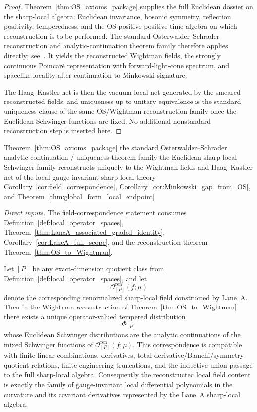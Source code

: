 \begin{proof}
Theorem~\ref{thm:OS_axioms_package} supplies the full Euclidean dossier on the sharp-local algebra: Euclidean invariance, bosonic symmetry, reflection positivity, temperedness, and the OS-positive positive-time algebra on which reconstruction is to be performed. The standard Osterwalder--Schrader reconstruction and analytic-continuation theorem family therefore applies directly; see~\cite{OS1,OS2}. It yields the reconstructed Wightman fields, the strongly continuous Poincar\'e representation with forward-light-cone spectrum, and spacelike locality after continuation to Minkowski signature.

The Haag--Kastler net is then the vacuum local net generated by the smeared reconstructed fields, and uniqueness up to unitary equivalence is the standard uniqueness clause of the same OS/Wightman reconstruction family once the Euclidean Schwinger functions are fixed. No additional nonstandard reconstruction step is inserted here.
\end{proof}

\dependencyledger
  {Theorem~\ref{thm:OS_axioms_package}}
  {the standard Osterwalder--Schrader analytic-continuation / uniqueness theorem family}
  {the Euclidean sharp-local Schwinger family reconstructs uniquely to the Wightman fields and Haag--Kastler net of the local gauge-invariant sharp-local theory}
  {Corollary~\ref{cor:field_correspondence}, Corollary~\ref{cor:Minkowski_gap_from_OS}, and Theorem~\ref{thm:global_form_local_endpoint}}

\noindent\emph{Direct inputs.} The field-correspondence statement consumes Definition~\ref{def:local_operator_spaces}, Theorem~\ref{thm:LaneA_associated_graded_identity}, Corollary~\ref{cor:LaneA_full_scope}, and the reconstruction theorem Theorem~\ref{thm:OS_to_Wightman}.\par

\begin{corollary}\label{cor:field_correspondence}
Let $[P]$ be any exact-dimension quotient class from Definition~\ref{def:local_operator_spaces}, and let
\[
\mathcal O^{\mathrm{ren}}_{[P]}(f;\mu)
\]
denote the corresponding renormalized sharp-local field constructed by Lane~A.
Then in the Wightman reconstruction of Theorem~\ref{thm:OS_to_Wightman} there exists a unique operator-valued tempered distribution
\[
\Phi_{[P]}
\]
whose Euclidean Schwinger distributions are the analytic continuations of the mixed Schwinger functions of $\mathcal O^{\mathrm{ren}}_{[P]}(f;\mu)$.
This correspondence is compatible with finite linear combinations, derivatives, total-derivative/Bianchi/symmetry quotient relations, finite engineering truncations, and the inductive-union passage to the full sharp-local algebra.
Consequently the reconstructed local field content is exactly the family of gauge-invariant local differential polynomials in the curvature and its covariant derivatives represented by the Lane~A sharp-local algebra.
\end{corollary}

